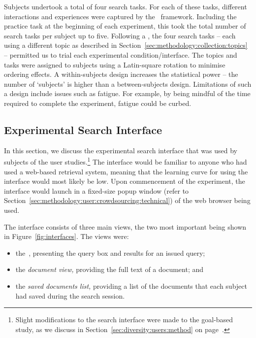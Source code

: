 Subjects undertook a total of four search tasks. For each of these tasks, different interactions and experiences were captured by the \treconomics~framework. Including the practice task at the beginning of each experiment, this took the total number of search tasks per subject up to five. Following a , the four search tasks -- each using a different topic as described in Section~\ref{sec:methodology:collection:topics} -- permitted us to trial each experimental condition/interface. The topics and tasks were assigned to subjects using a Latin-square rotation to minimise ordering effects. A within-subjects design increases the statistical power -- the number of `subjects' is higher than a between-subjects design. Limitations of such a design include issues such as fatigue. For example, by being mindful of the time required to complete the experiment, fatigue could be curbed.

\subsection{Experimental Search Interface}\label{sec:methodology:user:interface}
In this section, we discuss the experimental search interface that was used by subjects of the user studies.\footnote{Slight modifications to the search interface were made to the goal-based study, as we discuss in Section~\ref{sec:diversity:users:method} on page~\pageref{sec:diversity:users:method}.} The interface would be familiar to anyone who had used a web-based retrieval system, meaning that the learning curve for using the interface would most likely be low. Upon commencement of the experiment, the interface would launch in a fixed-size popup window (refer to Section~\ref{sec:methodology:user:crowdsourcing:technical}) of the web browser being used.

The interface consists of three main views, the two most important being shown in Figure~\ref{fig:interfaces}. The views were:

\begin{itemize}
    \item{the~, presenting the query box and results for an issued query;}
    \item{the \emph{document view,} providing the full text of a document; and}
    \item{the \emph{saved documents list,} providing a list of the documents that each subject had saved during the search session.}
\end{itemize}

